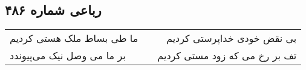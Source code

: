 \begin{center}
\section*{رباعی شماره ۴۸۶}
\label{sec:sh486}
\begin{longtable}{l p{0.5cm} r}
ما طی بساط ملک هستی کردیم
&&
بی نقض خودی خداپرستی کردیم
\\
بر ما می وصل نیک می‌پیوندد
&&
تف بر رخ می که زود مستی کردیم
\\
\end{longtable}
\end{center}
